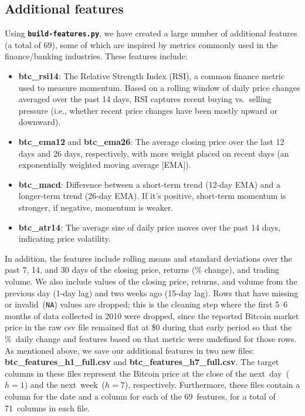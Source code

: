 \documentclass{article}
\begin{document}
\subsection{Additional features}
Using \textbf{\texttt{build-features.py}}, we have created a large number of additional features (a total of 69), some of which are inspired by metrics commonly used in the finance/banking industries. These features include:
\begin{itemize}
    \item \textbf{btc\_rsi14}: The Relative Strength Index (RSI), a common finance metric used to measure momentum. Based on a rolling window of daily price changes averaged over the past 14 days, RSI captures recent buying vs.\ selling pressure (i.e., whether recent price changes have been mostly upward or downward).
    \item \textbf{btc\_ema12} and \textbf{btc\_ema26}: The average closing price over the last 12 days and 26 days, respectively, with more weight placed on recent days (an exponentially weighted moving average [EMA]).
    \item \textbf{btc\_macd}: Difference between a short-term trend (12-day EMA) and a longer-term trend (26-day EMA). If it’s positive, short-term momentum is stronger, if negative, momentum is weaker.
    \item \textbf{btc\_atr14}: The average size of daily price moves over the past 14 days, indicating price volatility.
\end{itemize}
In addition, the features include rolling means and standard deviations over the past 7, 14, and 30 days of the closing price, returns (\% change), and trading volume. We also include values of the closing price, returns, and volume from the previous day (1-day lag) and two weeks ago (15-day lag). Rows that have missing or invalid~(\texttt{NA}) values are dropped; this is the cleaning step where the first 5--6 months of data collected in 2010 were dropped, since the reported Bitcoin market price in the raw csv file remained flat at \$0 during that early period so that the \%~daily change and features based on that metric were undefined for those rows. As mentioned above, we save our additional features in two new files: \textbf{btc\_features\_h1\_full.csv} and \textbf{btc\_features\_h7\_full.csv}. The target columns in these files represent the Bitcoin price at the close of the next~day~($h=1$) and the next~week~($h=7$), respectively. Furthermore, these files contain a column for the date and a column for each of the 69~features, for a total of 71~columns in each file.
\end{document}
